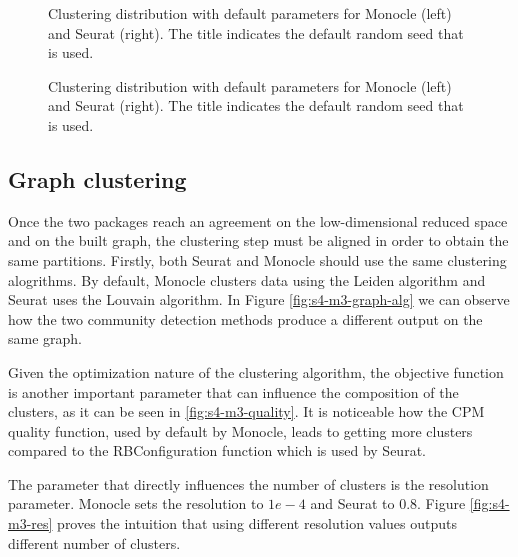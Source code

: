 \begin{landscape}
\begin{figure}[H]
    \centering
    \caption{\label{fig:s4-m3-graph-base}Clustering distribution with default parameters for Monocle (left) and Seurat (right). The title indicates the default random seed that is used.}
\end{figure}

\begin{figure}[H]
    \centering
    \caption{\label{fig:s4-m3-n-graph-type}Clustering distribution with default parameters for Monocle (left) and Seurat (right). The title indicates the default random seed that is used.}
\end{figure}
\end{landscape}

\subsection{Graph clustering}
Once the two packages reach an agreement on the low-dimensional reduced space and on the built graph, the clustering step must be aligned in order to obtain the same partitions. Firstly, both Seurat and Monocle should use the same clustering alogrithms. By default, Monocle clusters data using the Leiden algorithm and Seurat uses the Louvain algorithm. In Figure \ref{fig:s4-m3-graph-alg} we can observe how the two community detection methods produce a different output on the same graph.

Given the optimization nature of the clustering algorithm, the objective function is another important parameter that can influence the composition of the clusters, as it can be seen in \ref{fig:s4-m3-quality}. It is noticeable how the CPM quality function, used by default by Monocle, leads to getting more clusters compared to the RBConfiguration function which is used by Seurat.

The parameter that directly influences the number of clusters is the resolution parameter. Monocle sets the resolution to $1e-4$ and Seurat to $0.8$. Figure \ref{fig:s4-m3-res} proves the intuition that using different resolution values outputs different number of clusters.

